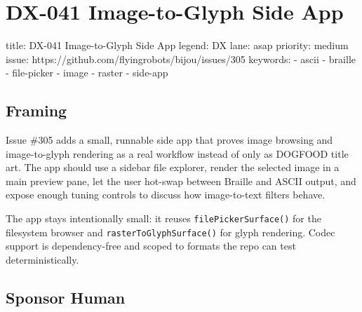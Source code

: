 \chapter{DX-041 Image-to-Glyph Side App}\label{record-137}

\smallskip

\begin{RecordMeta}
title: DX-041 Image-to-Glyph Side App
legend: DX
lane: asap
priority: medium
issue: https://github.com/flyingrobots/bijou/issues/305
keywords:
  - ascii
  - braille
  - file-picker
  - image
  - raster
  - side-app

\end{RecordMeta}

\section{Framing}\label{record-137-framing}

Issue \#305 adds a small, runnable side app that proves image browsing and image-to-glyph rendering as a real workflow instead of only as DOGFOOD title art. The app should use a sidebar file explorer, render the selected image in a main preview pane, let the user hot-swap between Braille and ASCII output, and expose enough tuning controls to discuss how image-to-text filters behave.

The app stays intentionally small: it reuses \texttt{f\allowbreak{}i\allowbreak{}l\allowbreak{}e\allowbreak{}P\allowbreak{}i\allowbreak{}c\allowbreak{}k\allowbreak{}e\allowbreak{}r\allowbreak{}S\allowbreak{}u\allowbreak{}r\allowbreak{}f\allowbreak{}a\allowbreak{}c\allowbreak{}e\allowbreak{}(\allowbreak{})} for the filesystem browser and \texttt{r\allowbreak{}a\allowbreak{}s\allowbreak{}t\allowbreak{}e\allowbreak{}r\allowbreak{}T\allowbreak{}o\allowbreak{}G\allowbreak{}l\allowbreak{}y\allowbreak{}p\allowbreak{}h\allowbreak{}S\allowbreak{}u\allowbreak{}r\allowbreak{}f\allowbreak{}a\allowbreak{}c\allowbreak{}e\allowbreak{}(\allowbreak{})} for glyph rendering. Codec support is dependency-free and scoped to formats the repo can test deterministically.

\section{Sponsor Human}\label{record-137-sponsor-human}

